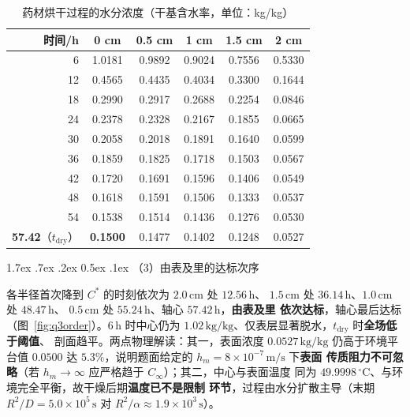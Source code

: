 \documentclass[withoutpreface,bwprint]{cumcmthesis} %
\makeatletter
\renewcommand\paragraph{\@startsection{paragraph}{4}{\z@}%
  {1.7ex \@plus .7ex \@minus .2ex}%
  {0.5ex \@plus .1ex}%
  {\normalfont\normalsize\bfseries}}
\makeatother
\begin{document}
\begin{table}[htbp]
    \centering
    \caption{药材烘干过程的水分浓度（干基含水率，单位：kg/kg）}
    \label{tab:q3t5}
    \renewcommand{\arraystretch}{1.30}%
    \begin{tabular*}{\textwidth}{@{\extracolsep{\fill}}rccccc@{}}
    \toprule
    时间/h & 0 cm & 0.5 cm & 1 cm & 1.5 cm & 2 cm \\
    \midrule
    6 & 1.0181 & 0.9892 & 0.9024 & 0.7556 & 0.5330 \\
    12 & 0.4565 & 0.4435 & 0.4034 & 0.3300 & 0.1644 \\
    18 & 0.2990 & 0.2917 & 0.2688 & 0.2254 & 0.0846 \\
    24 & 0.2378 & 0.2328 & 0.2167 & 0.1855 & 0.0665 \\
    30 & 0.2058 & 0.2018 & 0.1891 & 0.1640 & 0.0599 \\
    36 & 0.1859 & 0.1825 & 0.1718 & 0.1503 & 0.0567 \\
    42 & 0.1720 & 0.1691 & 0.1596 & 0.1406 & 0.0549 \\
    48 & 0.1618 & 0.1591 & 0.1506 & 0.1333 & 0.0537 \\
    54 & 0.1538 & 0.1514 & 0.1436 & 0.1276 & 0.0530 \\
    \textbf{57.42}（$t_{\mathrm{dry}}$） & \textbf{0.1500} & 0.1477 & 0.1402 & 0.1248 & 0.0527 \\
    \bottomrule
    \end{tabular*}
\end{table}

\paragraph{（3）由表及里的达标次序}

各半径首次降到 $C^{*}$ 的时刻依次为 $2.0\,\mathrm{cm}$ 处 $12.56\,\mathrm{h}$、
$1.5\,\mathrm{cm}$ 处 $36.14\,\mathrm{h}$、$1.0\,\mathrm{cm}$ 处 $48.47\,\mathrm{h}$、
$0.5\,\mathrm{cm}$ 处 $55.24\,\mathrm{h}$、轴心 $57.42\,\mathrm{h}$，\textbf{由表及里
依次达标}，轴心最后达标（图~\ref{fig:q3order}）。$6\,\mathrm{h}$ 时中心仍为
$1.02\,\mathrm{kg/kg}$、仅表层显著脱水，$t_{\mathrm{dry}}$ 时\textbf{全场低于阈值}、
剖面趋平。两点物理解读：其一，表面浓度 $0.0527\,\mathrm{kg/kg}$ 仍高于环境平台值
$0.0500$ 达 $5.3\%$，说明题面给定的 $h_m=8\times10^{-7}\,\mathrm{m/s}$ 下\textbf{表面
传质阻力不可忽略}（若 $h_m\to\infty$ 应严格趋于 $C_\infty$）；其二，中心与表面温度
同为 $49.9998\,^\circ\mathrm{C}$、与环境完全平衡，故干燥后期\textbf{温度已不是限制
环节}，过程由水分扩散主导（末期 $R^2/D=5.0\times10^{5}\,\mathrm{s}$ 对
$R^2/\alpha\approx1.9\times10^{3}\,\mathrm{s}$）。
\end{document}
